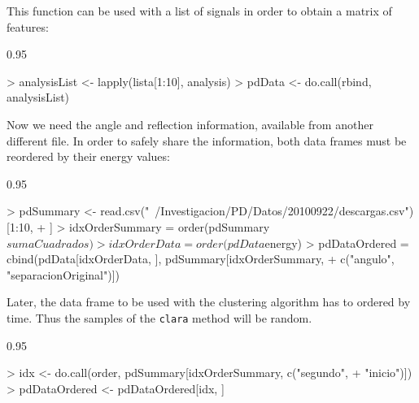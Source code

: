 \documentclass{article}
\renewenvironment{Schunk}{\begin{center}
    \scriptsize
    \begin{boxedminipage}{0.95\textwidth}}{
    \end{boxedminipage}\end{center}}
\begin{document}
This function can be used with a list of signals in order to obtain a
matrix of features:
\begin{Schunk}
\begin{Sinput}
> analysisList <- lapply(lista[1:10], analysis)
> pdData <- do.call(rbind, analysisList)
\end{Sinput}
\end{Schunk}

Now we need the angle and reflection information, available from
another different file. In order to safely share the information, both
data frames must be reordered by their energy values: 
\begin{Schunk}
\begin{Sinput}
> pdSummary <- read.csv("~/Investigacion/PD/Datos/20100922/descargas.csv")[1:10, 
+     ]
> idxOrderSummary = order(pdSummary$sumaCuadrados)
> idxOrderData = order(pdData$energy)
> pdDataOrdered = cbind(pdData[idxOrderData, ], pdSummary[idxOrderSummary, 
+     c("angulo", "separacionOriginal")])
\end{Sinput}
\end{Schunk}

Later, the data frame to be used with the clustering algorithm has to
ordered by time. Thus the samples of the \texttt{clara} method will
be random.
\begin{Schunk}
\begin{Sinput}
> idx <- do.call(order, pdSummary[idxOrderSummary, c("segundo", 
+     "inicio")])
> pdDataOrdered <- pdDataOrdered[idx, ]
\end{Sinput}
\end{Schunk}
\end{document}
